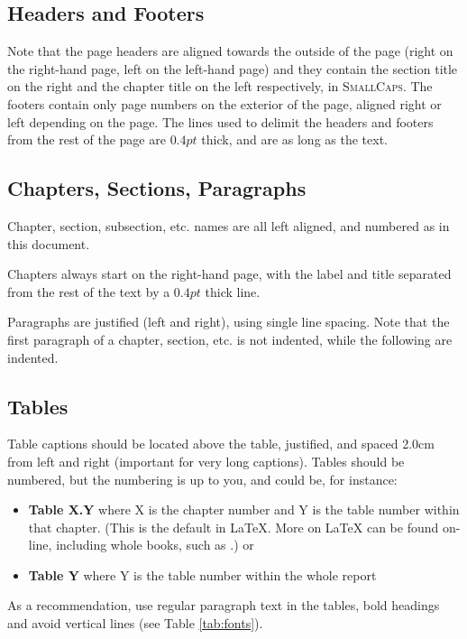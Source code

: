 \documentclass{cslthse-msc}
\begin{document}
\subsection{Headers and Footers}
Note that the page headers are aligned towards the outside of the page (right on the right-hand page, left on the left-hand page) and they contain the section title on the right and the chapter title on the left respectively, in \textsc{SmallCaps}. The footers contain only page numbers on the exterior of the page, aligned right or left depending on the page. The lines used to delimit the headers and footers from the rest of the page are $0.4 pt$ thick, and are as long as the text.

\subsection{Chapters, Sections, Paragraphs}
Chapter, section, subsection, etc. names are all left aligned, and numbered as in this document. 

Chapters always start on the right-hand page, with the label and title separated from the rest of the text by a $0.4 pt$ thick line.

Paragraphs are justified (left and right), using single line spacing. Note that the first paragraph of a chapter, section, etc. is not indented, while the following are indented.

\subsection{Tables}
Table captions should be located above the table, justified, and spaced 2.0cm from left and right (important for very long captions). Tables should be numbered, but the numbering is up to you, and could be, for instance:
\begin{itemize}
\item \textbf{Table X.Y} where X is the chapter number and Y is the table number within that chapter. (This is the default in \LaTeX. More on {\LaTeX} can be found on-line, including whole books, such as \cite{goossens93}.) or
\item \textbf{Table Y} where Y is the table number within the whole report
\end{itemize}
As a recommendation, use regular paragraph text in the tables, bold headings and avoid vertical lines (see Table \ref{tab:fonts}). 
\end{document}
